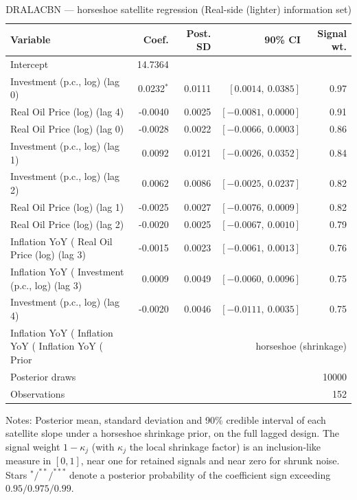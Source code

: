 \begin{table}[!htbp]
\centering
\caption{DRALACBN --- horseshoe satellite regression (Real-side (lighter) information set)}
\label{tab:dralacbn_real_side_lighter_horseshoe}
\begin{tabular}{lrrrr}
\toprule
Variable & Coef. & Post. SD & 90\% CI & Signal wt. \\
\midrule
Intercept & 14.7364 & & & \\
Investment (p.c., log) (lag 0) & 0.0232$^{*}$ & 0.0111 & $[0.0014,\ 0.0385]$ & 0.97 \\
Real Oil Price (log) (lag 4) & -0.0040 & 0.0025 & $[-0.0081,\ 0.0000]$ & 0.91 \\
Real Oil Price (log) (lag 0) & -0.0028 & 0.0022 & $[-0.0066,\ 0.0003]$ & 0.86 \\
Investment (p.c., log) (lag 1) & 0.0092 & 0.0121 & $[-0.0026,\ 0.0352]$ & 0.84 \\
Investment (p.c., log) (lag 2) & 0.0062 & 0.0086 & $[-0.0025,\ 0.0237]$ & 0.82 \\
Real Oil Price (log) (lag 1) & -0.0025 & 0.0027 & $[-0.0076,\ 0.0009]$ & 0.82 \\
Real Oil Price (log) (lag 2) & -0.0020 & 0.0025 & $[-0.0067,\ 0.0010]$ & 0.79 \\
Inflation YoY (%
Real Oil Price (log) (lag 3) & -0.0015 & 0.0023 & $[-0.0061,\ 0.0013]$ & 0.76 \\
Inflation YoY (%
Investment (p.c., log) (lag 3) & 0.0009 & 0.0049 & $[-0.0060,\ 0.0096]$ & 0.75 \\
Investment (p.c., log) (lag 4) & -0.0020 & 0.0046 & $[-0.0111,\ 0.0035]$ & 0.75 \\
Inflation YoY (%
Inflation YoY (%
Inflation YoY (%
\midrule
Prior & \multicolumn{4}{r}{horseshoe (shrinkage)} \\
Posterior draws & \multicolumn{4}{r}{10000} \\
Observations & \multicolumn{4}{r}{152} \\
\bottomrule
\end{tabular}
\begin{tablenotes}\small
\item Notes: Posterior mean, standard deviation and 90\% credible interval of each satellite slope under a horseshoe shrinkage prior, on the full lagged design. The signal weight $1-\kappa_j$ (with $\kappa_j$ the local shrinkage factor) is an inclusion-like measure in $[0,1]$, near one for retained signals and near zero for shrunk noise. Stars $^{*}/^{**}/^{***}$ denote a posterior probability of the coefficient sign exceeding $0.95/0.975/0.99$.
\end{tablenotes}
\end{table}
